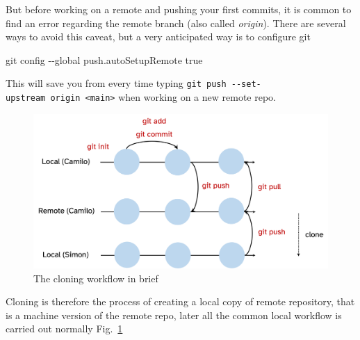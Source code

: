 \documentclass[
  letterpaper,
  DIV=11,
  numbers=noendperiod,
  oneside]{scrreprt}
\newenvironment{Shaded}{\begin{snugshade}}{\end{snugshade}}
\newcommand{\AttributeTok}[1]{\textcolor[rgb]{0.40,0.45,0.13}{#1}}
\newcommand{\FunctionTok}[1]{\textcolor[rgb]{0.28,0.35,0.67}{#1}}
\newcommand{\NormalTok}[1]{\textcolor[rgb]{0.00,0.23,0.31}{#1}}
\begin{document}
\begin{tcolorbox}[enhanced jigsaw, opacityback=0, leftrule=.75mm, breakable, titlerule=0mm, toprule=.15mm, rightrule=.15mm, title=\textcolor{quarto-callout-caution-color}{\faFire}\hspace{0.5em}{Caution}, colback=white, opacitybacktitle=0.6, toptitle=1mm, bottomtitle=1mm, colframe=quarto-callout-caution-color-frame, colbacktitle=quarto-callout-caution-color!10!white, arc=.35mm, coltitle=black, bottomrule=.15mm, left=2mm]
But before working on a remote and pushing your first commits, it is
common to find an error regarding the remote branch (also called
\emph{origin}). There are several ways to avoid this caveat, but a very
anticipated way is to configure git

\begin{Shaded}
\begin{Highlighting}[]
\FunctionTok{git}\NormalTok{ config }\AttributeTok{{-}{-}global}\NormalTok{ push.autoSetupRemote true}
\end{Highlighting}
\end{Shaded}

This will save you from every time typing
\texttt{git\ push\ -\/-set-upstream\ origin\ \textless{}main\textgreater{}}
when working on a new remote repo.
\end{tcolorbox}

\begin{figure}

{\centering \includegraphics{chs-command-line/imgs-cli/gitcloning.png}

}

\caption{\label{fig-cloning}The cloning workflow in brief}

\end{figure}

Cloning is therefore the process of creating a local copy of remote
repository, that is a machine version of the remote repo, later all the
common local workflow is carried out normally Fig.~\ref{fig-cloning}
\end{document}
